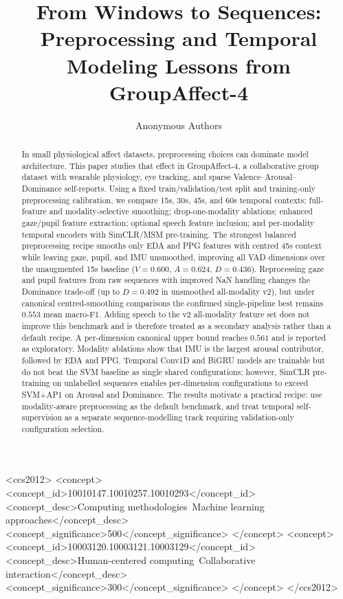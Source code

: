 \documentclass[sigconf,review,anonymous]{acmart}
\title{From Windows to Sequences: Preprocessing and Temporal Modeling Lessons
from GroupAffect-4}
\author{Anonymous Authors}
\affiliation{\institution{Anonymous Institution}}
\begin{document}
\begin{abstract}
In small physiological affect datasets, preprocessing choices can dominate
model architecture.
This paper studies that effect in GroupAffect-4, a collaborative group dataset
with wearable physiology, eye tracking, and sparse Valence--Arousal--Dominance
self-reports.
Using a fixed train/validation/test split and training-only preprocessing
calibration, we compare 15s, 30s, 45s, and 60s temporal contexts; full-feature
and modality-selective smoothing; drop-one-modality ablations; enhanced
gaze/pupil feature extraction; optional speech feature inclusion; and
per-modality temporal encoders with SimCLR/MSM pre-training.
The strongest balanced preprocessing recipe smooths only EDA and PPG features
with centred 45s context while leaving gaze, pupil, and IMU unsmoothed,
improving all VAD dimensions over the unaugmented 15s baseline
($V=0.600$, $A=0.624$, $D=0.436$).
Reprocessing gaze and pupil features from raw sequences with improved NaN
handling changes the Dominance trade-off (up to $D=0.492$ in unsmoothed
all-modality v2), but under canonical centred-smoothing comparisons the
confirmed single-pipeline best remains $0.553$ mean macro-F1.
Adding speech to the v2 all-modality feature set does not improve this
benchmark and is therefore treated as a secondary analysis rather than a
default recipe.
A per-dimension canonical upper bound reaches $0.561$ and is reported as
exploratory.
Modality ablations show that IMU is the largest arousal contributor, followed
by EDA and PPG.
Temporal Conv1D and BiGRU models are trainable but do not beat the SVM
baseline as single shared configurations; however, SimCLR pre-training on
unlabelled sequences enables per-dimension configurations to exceed SVM+AP1 on
Arousal and Dominance.
The results motivate a practical recipe: use modality-aware preprocessing as
the default benchmark, and treat temporal self-supervision as a separate
sequence-modelling track requiring validation-only configuration selection.
\end{abstract}

\begin{CCSXML}
<ccs2012>
  <concept>
    <concept_id>10010147.10010257.10010293</concept_id>
    <concept_desc>Computing methodologies~Machine learning approaches</concept_desc>
    <concept_significance>500</concept_significance>
  </concept>
  <concept>
    <concept_id>10003120.10003121.10003129</concept_id>
    <concept_desc>Human-centered computing~Collaborative interaction</concept_desc>
    <concept_significance>300</concept_significance>
  </concept>
</ccs2012>
\end{CCSXML}
\end{document}
